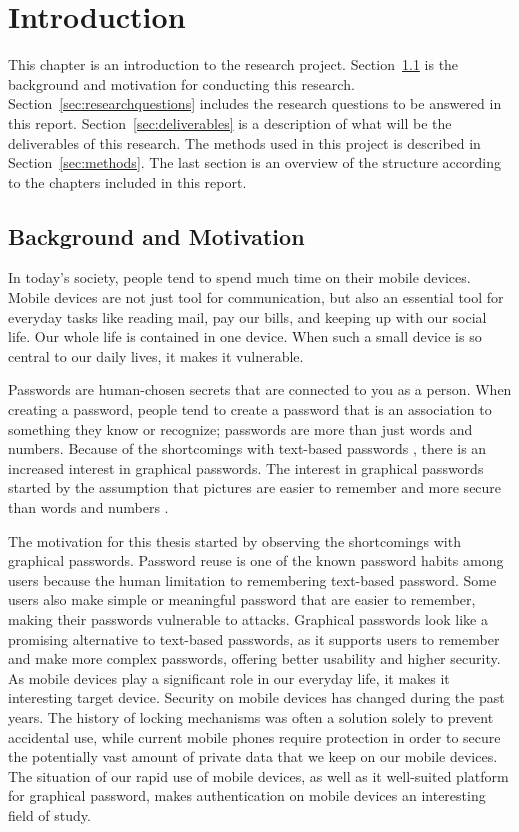 \chapter{Introduction}

  This chapter is an introduction to the research project. Section~\ref{sec:background} is the background and motivation for conducting this research. Section~\ref{sec:researchquestions} includes the research questions to be answered in this report. Section~\ref{sec:deliverables} is a description of what will be the deliverables of this research.
  The methods used in this project is described in Section~\ref{sec:methods}. The last section is an overview of the structure according to the chapters included in this report. 

  \clearpage
  \section{Background and Motivation} \label{sec:background}
  In today's society, people tend to spend much time on their mobile devices. Mobile devices are not just tool for communication, but also an essential tool for everyday tasks like reading mail, pay our bills, and keeping up with our social life. Our whole life is contained in one device. When such a small device is so central to our daily lives, it makes it vulnerable.

  Passwords are human-chosen secrets that are connected to you as a person. When creating a password, people tend to create a password that is an association to something they know or recognize; passwords are more than just words and numbers. Because of the shortcomings with text-based passwords \cite{UnixPasswords}, there is an increased interest in graphical passwords. The interest in graphical passwords started by the assumption that pictures are easier to remember and more secure than words and numbers \cite{DeAngeli}.

  The motivation for this thesis started by observing the shortcomings with graphical passwords. Password reuse is one of the known password habits among users because the human limitation to remembering text-based password. Some users also make simple or meaningful password that are easier to remember, making their passwords vulnerable to attacks. Graphical passwords look like a promising alternative to text-based passwords, as it supports users to remember and make more complex passwords, offering better usability and higher security. As mobile devices play a significant role in our everyday life, it makes it interesting target device. Security on mobile devices has changed during the past years. The history of locking mechanisms was often a solution solely to prevent accidental use, while current mobile phones require protection in order to secure the potentially vast amount of private data that we keep on our mobile devices. The situation of our rapid use of mobile devices, as well as it well-suited platform for graphical password, makes authentication on mobile devices an interesting field of study.

